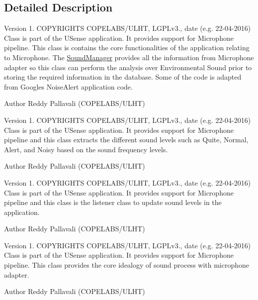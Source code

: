 \subsection{Detailed Description}
\begin{DoxyVersion}{Version}
1. C\+O\+P\+Y\+R\+I\+G\+H\+T\+S C\+O\+P\+E\+L\+A\+B\+S/\+U\+L\+H\+T, L\+G\+P\+Lv3., date (e.\+g. 22-\/04-\/2016) Class is part of the U\+Sense application. It provides support for Microphone pipeline. This class is contains the core functionalities of the application relating to Microphone. The \hyperlink{classcs_1_1usense_1_1microphone_1_1_sound_manager}{Sound\+Manager} provides all the information from Microphone adapter so this class can perform the analysis over Environmental Sound prior to storing the required information in the database. Some of the code is adapted from Google\textquotesingle{}s Noise\+Alert application code. 
\end{DoxyVersion}
\begin{DoxyAuthor}{Author}
Reddy Pallavali (C\+O\+P\+E\+L\+A\+B\+S/\+U\+L\+H\+T)
\end{DoxyAuthor}
\begin{DoxyVersion}{Version}
1. C\+O\+P\+Y\+R\+I\+G\+H\+T\+S C\+O\+P\+E\+L\+A\+B\+S/\+U\+L\+H\+T, L\+G\+P\+Lv3., date (e.\+g. 22-\/04-\/2016) Class is part of the U\+Sense application. It provides support for Microphone pipeline and this class extracts the different sound levels such as Quite, Normal, Alert, and Noisy based on the sound frequency levels. 
\end{DoxyVersion}
\begin{DoxyAuthor}{Author}
Reddy Pallavali (C\+O\+P\+E\+L\+A\+B\+S/\+U\+L\+H\+T)
\end{DoxyAuthor}
\begin{DoxyVersion}{Version}
1. C\+O\+P\+Y\+R\+I\+G\+H\+T\+S C\+O\+P\+E\+L\+A\+B\+S/\+U\+L\+H\+T, L\+G\+P\+Lv3., date (e.\+g. 22-\/04-\/2016) Class is part of the U\+Sense application. It provides support for Microphone pipeline and this class is the listener class to update sound levels in the application. 
\end{DoxyVersion}
\begin{DoxyAuthor}{Author}
Reddy Pallavali (C\+O\+P\+E\+L\+A\+B\+S/\+U\+L\+H\+T)
\end{DoxyAuthor}
\begin{DoxyVersion}{Version}
1. C\+O\+P\+Y\+R\+I\+G\+H\+T\+S C\+O\+P\+E\+L\+A\+B\+S/\+U\+L\+H\+T, L\+G\+P\+Lv3., date (e.\+g. 22-\/04-\/2016) Class is part of the U\+Sense application. It provides support for Microphone pipeline. This class provides the core idealogy of sound process with microphone adapter. 
\end{DoxyVersion}
\begin{DoxyAuthor}{Author}
Reddy Pallavali (C\+O\+P\+E\+L\+A\+B\+S/\+U\+L\+H\+T) 
\end{DoxyAuthor}

